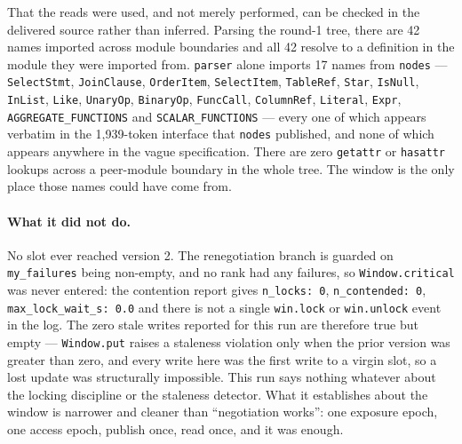 \documentclass[11pt]{article}
\begin{document}
That the reads were used, and not merely performed, can be checked in the delivered source rather
than inferred. Parsing the round-1 tree, there are 42 names imported across module boundaries and
all 42 resolve to a definition in the module they were imported from. \texttt{parser} alone
imports 17 names from \texttt{nodes} --- \texttt{SelectStmt}, \texttt{JoinClause},
\texttt{OrderItem}, \texttt{SelectItem}, \texttt{TableRef}, \texttt{Star}, \texttt{IsNull},
\texttt{InList}, \texttt{Like}, \texttt{UnaryOp}, \texttt{BinaryOp}, \texttt{FuncCall},
\texttt{ColumnRef}, \texttt{Literal}, \texttt{Expr}, \texttt{AGGREGATE\_FUNCTIONS} and
\texttt{SCALAR\_FUNCTIONS} --- every one of which appears verbatim in the 1{,}939-token interface
that \texttt{nodes} published, and none of which appears anywhere in the vague specification.
There are zero \texttt{getattr} or \texttt{hasattr} lookups across a peer-module boundary in the
whole tree. The window is the only place those names could have come from.

\paragraph{What it did not do.} No slot ever reached version 2. The renegotiation branch is
guarded on \texttt{my\_failures} being non-empty, and no rank had any failures, so
\texttt{Window.critical} was never entered: the contention report gives \texttt{n\_locks: 0},
\texttt{n\_contended: 0}, \texttt{max\_lock\_wait\_s: 0.0} and there is not a single
\texttt{win.lock} or \texttt{win.unlock} event in the log. The zero stale writes reported for this
run are therefore true but empty --- \texttt{Window.put} raises a staleness violation only when
the prior version was greater than zero, and every write here was the first write to a virgin
slot, so a lost update was structurally impossible. This run says nothing whatever about the
locking discipline or the staleness detector. What it establishes about the window is narrower
and cleaner than ``negotiation works'': one exposure epoch, one access epoch, publish once, read
once, and it was enough.
\end{document}
